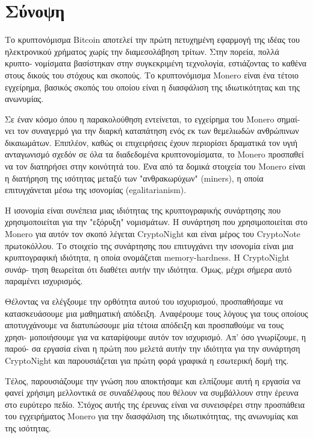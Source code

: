 %
%
\thispagestyle{empty}
\chapter*{Σύνοψη}
Το κρυπτονόμισμα Bitcoin αποτελεί την πρώτη πετυχημένη εφαρμογή της ιδέας του ηλεκτρονικού χρήματος χωρίς την διαμεσολάβηση τρίτων. Στην πορεία, πολλά κρυπτο- νομίσματα βασίστηκαν στην συγκεκριμένη τεχνολογία, εστιάζοντας το καθένα στους δικούς του στόχους και σκοπούς. Το κρυπτονόμισμα Monero είναι ένα τέτοιο εγχείρημα, βασικός σκοπός του οποίου είναι η διασφάλιση της ιδιωτικότητας και της ανωνυμίας.

Σε έναν κόσμο όπου η παρακολούθηση εντείνεται, το εγχείρημα του Monero σημαί- νει τον συναγερμό για την διαρκή καταπάτηση ενός εκ των θεμελιωδών ανθρώπινων δικαιωμάτων. Επιπλέον, καθώς οι επιχειρήσεις έχουν περιορίσει δραματικά τον υγιή ανταγωνισμό σχεδόν σε όλα τα διαδεδομένα κρυπτονομίσματα, το Monero προσπαθεί να τον διατηρήσει στην κοινότητά του. Ένα από τα δομικά στοιχεία του Monero είναι η διατήρηση της ισότητας μεταξύ των "ανθρακωρύχων" (miners), η οποία επιτυγχάνεται μέσω της ισονομίας (egalitarianism).

Η ισονομία είναι συνέπεια μιας ιδιότητας της κρυπτογραφικής συνάρτησης που χρησιμοποιείται για την "εξόρυξη" νομισμάτων. Η συνάρτηση που χρησιμοποιείται στο Monero για αυτόν τον σκοπό λέγεται CryptoNight και είναι μέρος του CryptoNote πρωτοκόλλου. Το στοιχείο της συνάρτησης που επιτυγχάνει την ισονομία είναι μια κρυπτογραφική ιδιότητα, η οποία ονομάζεται memory-hardness. Η CryptoNight συνάρ- τηση θεωρείται ότι διαθέτει αυτήν την ιδιότητα. Όμως, μέχρι σήμερα αυτό παραμένει ισχυρισμός.

Θέλοντας να ελέγξουμε την ορθότητα αυτού του ισχυρισμού, προσπαθήσαμε να κατασκευάσουμε μια μαθηματική απόδειξη. Αναφέρουμε τους λόγους για τους οποίους αποτυγχάνουμε να διατυπώσουμε μία τέτοια απόδειξη και προσπαθούμε να τους χρησι- μοποιήσουμε για να καταρίψουμε αυτόν τον ισχυρισμό. Απ' όσο γνωρίζουμε, η παρού- σα εργασία είναι η πρώτη που μελετά αυτήν την ιδιότητα για την συνάρτηση CryptoNight και παρουσιάζεται για πρώτη φορά γραφικά η εσωτερική δομή της.

Τέλος, παρουσιάζουμε την γνώση που αποκτήσαμε και ελπίζουμε αυτή η εργασία να φανεί χρήσιμη μελλοντικά σε συναδέλφους που θέλουν να συμβάλλουν στην έρευνα στο ευρύτερο πεδίο. Στόχος αυτής της έρευνας είναι να συνεισφέρει στην προσπάθεια του εγχειρήματος Monero για την διασφάλιση της ιδιωτικότητας, της ανωνυμίας και της ισότητας.
\clearpage
%
%
\thispagestyle{empty}
\null
\clearpage
